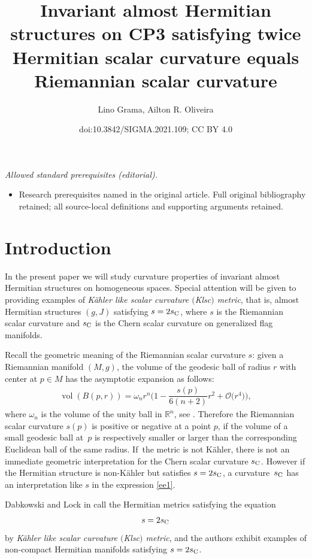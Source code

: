 \documentclass[10pt,a4paper]{amsart}
\title{Invariant almost Hermitian structures on CP3 satisfying twice Hermitian scalar curvature equals Riemannian scalar curvature}
\author{Lino Grama, Ailton R. Oliveira}
\date{doi:10.3842/SIGMA.2021.109; CC BY 4.0}
\numberwithin{equation}{section}
\begin{document}
\maketitle
\noindent\textit{Allowed standard prerequisites (editorial).}\begin{itemize}
\item Research prerequisites named in the original article. Full original bibliography retained; all source-local definitions and supporting arguments retained.
\end{itemize}\medskip
\section{Introduction}

In the present paper we will study curvature properties of invariant almost Hermitian structures on homogeneous spaces. Special attention will be given to providing examples of {\em K\"ahler like scalar curvature $($Klsc$)$ metric}, that is, almost Hermitian structures $(g,J)$ satisfying $s=2s_{\rm C}$, where $s$ is the Riemannian scalar curvature and $s_{\rm C}$ is the Chern scalar curvature on generalized flag manifolds.

Recall the geometric meaning of the Riemannian scalar curvature $s$: given a Riemannian manifold $(M,g)$, the volume of the geodesic ball of radius $r$ with center at $p\in M$ has the asymptotic expansion as follows:
\begin{gather}\label{ee1}
\operatorname{vol}( B(p,r))=\omega_{n}r^{n}\bigg(1-\dfrac{s(p)}{6(n+2)}r^{2}+\mathcal{O}\big(r^{4}\big)\bigg),
\end{gather}
where $\omega_{n}$ is the volume of the unity ball in $\mathbb{R}^{n}$, see \cite{besse,lock}. Therefore the Riemannian scalar curvature $s(p)$ is positive or negative at a point $p$, if the volume of a small geodesic ball at~$p$ is respectively smaller or larger than the corresponding Euclidean ball of the same radius. If~the metric is not K\"ahler, there is not an immediate geometric interpretation for the Chern scalar curvature $s_{\rm C}$. However if the Hermitian structure is non-K\"ahler but satisfies $s=2s_{\rm C}$, a curvature~$s_{\rm C}$ has an interpretation like $s$ in the expression \eqref{ee1}.

Dabkowski and Lock in \cite{lock} call the Hermitian metrics satisfying the equation
\begin{gather*}
s=2s_{\rm C}
\end{gather*}
by {\it K\"ahler like scalar curvature $($Klsc$)$ metric}, and the authors exhibit examples of non-compact Hermitian manifolds satisfying $s=2s_{\rm C}$.
\end{document}
